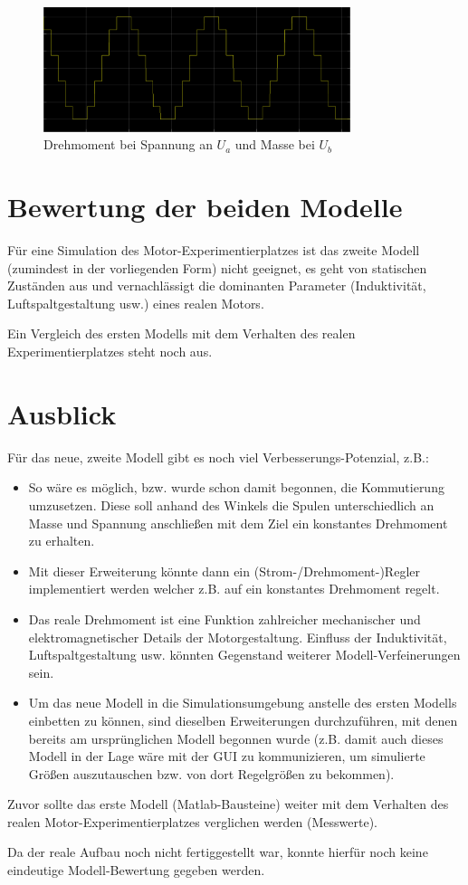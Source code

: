 \begin{figure}[htbp]
	\centering
	\includegraphics[width=0.8\textwidth]{./sim/pictures/drehmoment.png}
	\caption{Drehmoment bei Spannung an $U_a$ und Masse bei $U_b$}
	\label{FigDrehmoment}
\end{figure}


\section{Bewertung der beiden Modelle}
Für eine Simulation des Motor-Experimentierplatzes ist das zweite Modell (zumindest in der vorliegenden Form) nicht geeignet, es geht von statischen Zuständen aus und vernachlässigt die dominanten Parameter (Induktivität, Luftspaltgestaltung usw.) eines realen Motors.

Ein Vergleich des ersten Modells mit dem Verhalten des realen Experimentierplatzes steht noch aus.

\section{Ausblick}
Für das neue, zweite Modell gibt es noch viel Verbesserungs-Potenzial, z.B.:

\begin{itemize}
	\item So wäre es möglich, bzw. wurde schon damit begonnen, die Kommutierung umzusetzen. Diese soll anhand des Winkels die Spulen unterschiedlich an Masse und Spannung anschließen mit dem Ziel ein konstantes Drehmoment zu erhalten.
	
	\item Mit dieser Erweiterung könnte dann ein (Strom-/Drehmoment-)Regler implementiert werden welcher z.B. auf ein konstantes Drehmoment regelt.
	
	\item Das reale Drehmoment ist eine Funktion zahlreicher mechanischer und elektromagnetischer Details der Motorgestaltung. Einfluss der Induktivität, Luftspaltgestaltung usw. könnten Gegenstand weiterer Modell-Verfeinerungen sein. 
	
	\item Um das neue Modell in die Simulationsumgebung anstelle des ersten Modells einbetten zu können, sind dieselben Erweiterungen durchzuführen, mit denen bereits am ursprünglichen Modell begonnen wurde (z.B. damit auch dieses Modell in der Lage wäre mit der GUI zu kommunizieren, um simulierte Größen auszutauschen bzw. von dort Regelgrößen zu bekommen).
\end{itemize}

Zuvor sollte das erste Modell (Matlab-Bausteine) weiter mit dem Verhalten des realen Motor-Experimentierplatzes verglichen werden (Messwerte). 

Da der reale Aufbau noch nicht fertiggestellt war, konnte hierfür noch keine eindeutige Modell-Bewertung gegeben werden.




